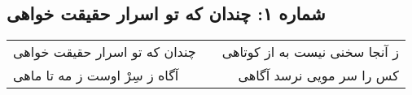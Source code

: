 \begin{center}
\section*{شماره ۱: چندان که تو اسرار حقیقت خواهی}
\label{sec:001}
\begin{longtable}{l p{0.5cm} r}
چندان که تو اسرار حقیقت خواهی
&&
ز آنجا سخنی نیست به از کوتاهی
\\
آگاه ز سِرْ اوست ز مه تا ماهی
&&
کس را سر مویی نرسد آگاهی
\\
\end{longtable}
\end{center}
